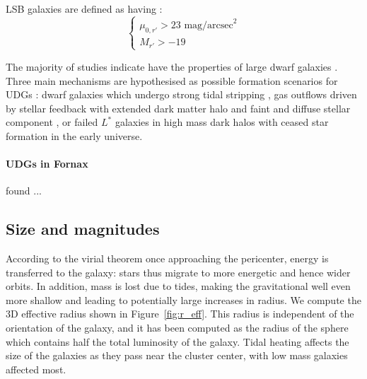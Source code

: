 LSB galaxies are defined as having \citep{Venhola2017}:
\begin{equation}
\begin{cases}
 \mu_{0,r'} > 23 \mbox{ mag/arcsec}^2\\
 M_{r'} > -19
\end{cases}
\end{equation}

The majority of studies indicate have the properties of large dwarf galaxies \citep{Sandage1984, Roman2017, Venhola2017, Saifollahi2021}.
Three main mechanisms are hypothesised as possible formation scenarios for UDGs \citep{Rong2020}: dwarf galaxies which undergo strong tidal stripping \citep{Venhola2017, Carleton2018, Rong2020a}, gas outflows driven by stellar feedback with extended dark matter halo and faint and diffuse stellar component \citep{DiCintio2017, ManceraPina2019}, or failed $L^*$ galaxies in high mass dark halos with ceased star formation in the early universe.

\paragraph{UDGs in Fornax}
\citet{Venhola2019} found ... %

\subsection{Size and magnitudes}
According to the virial theorem %
once approaching the pericenter, energy is transferred to the galaxy: stars thus migrate to more energetic and hence wider orbits.
In addition, mass is lost due to tides, making the gravitational well even more shallow and leading to potentially large increases in radius.
We compute the 3D effective radius shown in Figure~\ref{fig:r_eff}.
This radius is independent of the orientation of the galaxy, and it has been computed as the radius of the sphere which contains half the total luminosity of the galaxy.
Tidal heating affects the size of the galaxies as they pass near the cluster center, with low mass galaxies affected most.


